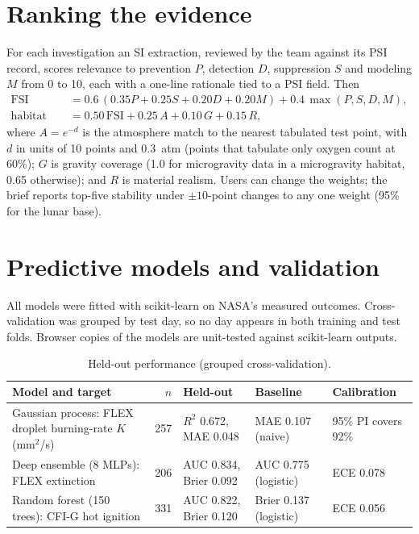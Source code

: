 \documentclass[10pt,letterpaper]{article}
\newcommand{\Otwo}{\ce{O2}}
\begin{document}
\section{Ranking the evidence}
For each investigation an SI extraction, reviewed by the team against its PSI record, scores relevance to prevention $P$, detection $D$, suppression $S$ and modeling $M$ from 0 to 10, each with a one-line rationale tied to a PSI field. Then
\begin{align}
\mathrm{FSI} &= 0.6\,(0.35P+0.25S+0.20D+0.20M) + 0.4\,\max(P,S,D,M),\\
\text{habitat score} &= 0.50\,\mathrm{FSI} + 0.25\,A + 0.10\,G + 0.15\,R,
\end{align}
where $A=e^{-d}$ is the atmosphere match to the nearest tabulated test point, with $d$ in units of 10 \Otwo{} points and 0.3~atm (points that tabulate only oxygen count at 60\%); $G$ is gravity coverage (1.0 for microgravity data in a microgravity habitat, 0.65 otherwise); and $R$ is material realism. Users can change the weights; the brief reports top-five stability under $\pm10$-point changes to any one weight (95\% for the lunar base).

\section{Predictive models and validation}
All models were fitted with scikit-learn on NASA's measured outcomes. Cross-validation was grouped by test day, so no day appears in both training and test folds. Browser copies of the models are unit-tested against scikit-learn outputs.

\begin{table}[h]
\centering\small
\caption{Held-out performance (grouped cross-validation).}\label{tab:models}
\begin{tabularx}{\linewidth}{@{}Xrlll@{}}
\toprule
Model and target & $n$ & Held-out & Baseline & Calibration \\
\midrule
Gaussian process: FLEX droplet burning-rate $K$ (mm$^2$/s) & 257 & $R^2$ 0.672, MAE 0.048 & MAE 0.107 (naive) & 95\% PI covers 92\% \\
Deep ensemble (8 MLPs): FLEX extinction & 206 & AUC 0.834, Brier 0.092 & AUC 0.775 (logistic) & ECE 0.078 \\
Random forest (150 trees): CFI-G hot ignition & 331 & AUC 0.822, Brier 0.120 & Brier 0.137 (logistic) & ECE 0.056 \\
\bottomrule
\end{tabularx}
\end{table}
\end{document}
